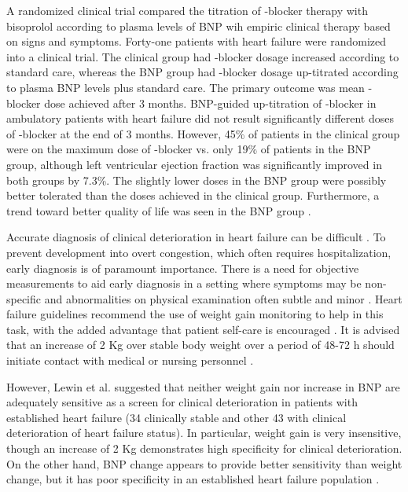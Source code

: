 \documentclass[14pt,a4paper,onecolumn]{extarticle}
\begin{document}
A  randomized clinical trial compared the titration of \beta-blocker therapy with bisoprolol according to plasma levels of BNP wih empiric clinical therapy based on signs and symptoms. Forty-one patients with heart failure were randomized into a clinical trial. The clinical group had \beta-blocker dosage increased according to standard care, whereas the BNP group had \beta-blocker dosage up-titrated according to plasma BNP levels plus standard care. The primary outcome was mean \beta-blocker dose achieved after 3 months. BNP-guided up-titration of \beta-blocker in ambulatory patients with heart failure did not result significantly different doses of \beta-blocker at the end of 3 months. However, 45\% of patients in the clinical group were on the maximum dose of \beta-blocker vs. only 19\% of patients in the BNP group, although left ventricular ejection fraction was significantly improved in both groups by 7.3\%. The slightly lower doses in the BNP group were possibly better tolerated than the doses achieved in the clinical group. Furthermore, a trend toward better quality of life was seen in the BNP group \citep{bib3294}.

Accurate diagnosis of clinical deterioration in heart failure can be difficult \citep{bib368} \citep{bib369}. To prevent development into overt congestion, which often requires hospitalization, early diagnosis is of paramount importance. There is a need for objective measurements to aid early diagnosis in a setting where symptoms may be non-specific and abnormalities on physical examination often subtle and minor \citep{bib3295}. Heart failure guidelines recommend the use of weight gain monitoring to help in this task, with the added advantage that patient self-care is encouraged \citep{bib368} \citep{bib369}. It is advised that an increase of 2 Kg over stable body weight over a period of 48-72 h should initiate contact with medical or nursing personnel \citep{bib368} \citep{bib369} \citep{bib3295}.

However, Lewin et al.  suggested that neither weight gain nor increase in BNP are adequately sensitive as a screen for clinical deterioration in patients with established heart failure (34 clinically stable and other 43 with clinical deterioration of heart failure status). In particular, weight gain is very insensitive, though an increase of 2 Kg demonstrates high specificity for clinical deterioration. On the other hand, BNP change appears to provide better sensitivity than weight change, but it has poor specificity in an established heart failure population \citep{bib3295}.
\end{document}
